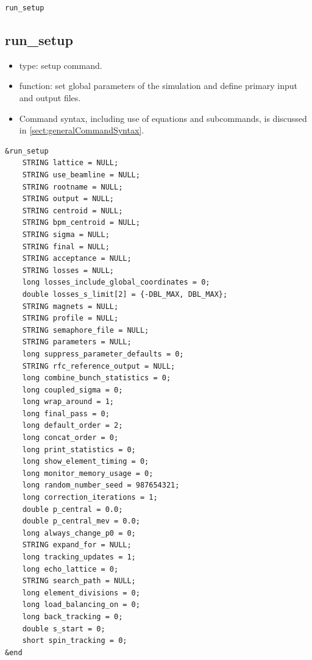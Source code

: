 \documentclass[11pt]{article}
\begin{document}
\newpage
\begin{center}{\Large\verb|run_setup|}\end{center}
\subsection{run\_setup \label{subsec:runsetup}}

\begin{itemize}
\item type: setup command.
\item function: set global parameters of the simulation and define primary input and output files.
\item Command syntax, including use of equations and subcommands, is discussed in \ref{sect:generalCommandSyntax}.
\end{itemize}

\begin{verbatim}
&run_setup
    STRING lattice = NULL;
    STRING use_beamline = NULL;
    STRING rootname = NULL;
    STRING output = NULL;
    STRING centroid = NULL;
    STRING bpm_centroid = NULL;
    STRING sigma = NULL;
    STRING final = NULL;
    STRING acceptance = NULL;
    STRING losses = NULL;
    long losses_include_global_coordinates = 0;
    double losses_s_limit[2] = {-DBL_MAX, DBL_MAX};
    STRING magnets = NULL;
    STRING profile = NULL;
    STRING semaphore_file = NULL;
    STRING parameters = NULL;
    long suppress_parameter_defaults = 0;
    STRING rfc_reference_output = NULL;
    long combine_bunch_statistics = 0;
    long coupled_sigma = 0;
    long wrap_around = 1;
    long final_pass = 0;
    long default_order = 2;
    long concat_order = 0;
    long print_statistics = 0;
    long show_element_timing = 0;
    long monitor_memory_usage = 0;
    long random_number_seed = 987654321;
    long correction_iterations = 1;
    double p_central = 0.0;
    double p_central_mev = 0.0;
    long always_change_p0 = 0;
    STRING expand_for = NULL; 
    long tracking_updates = 1;
    long echo_lattice = 0;
    STRING search_path = NULL;
    long element_divisions = 0;
    long load_balancing_on = 0;
    long back_tracking = 0;
    double s_start = 0;
    short spin_tracking = 0;
&end
\end{verbatim}
\end{document}
